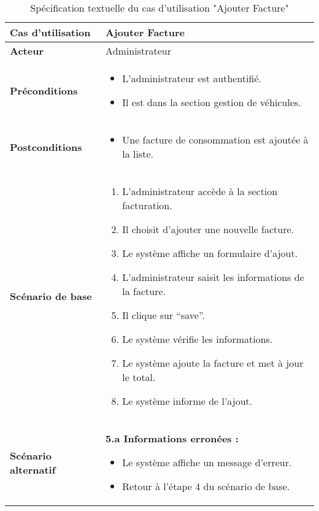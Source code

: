 \documentclass[a4paper,11pt]{report}
\begin{document}
\begin{table}[H]
  \centering
  \renewcommand{\arraystretch}{1.5}
  \caption{Spécification textuelle du cas d'utilisation "Ajouter Facture"}
  \begin{tabularx}{\textwidth}{|l|X|}
    \hline
    \textbf{Cas d'utilisation} & Ajouter Facture \\ \hline
    \textbf{Acteur}            & Administrateur \\ \hline
    \textbf{Préconditions}     & 
      \begin{itemize}
        \item L’administrateur est authentifié.
        \item Il est dans la section gestion de véhicules.
      \end{itemize} \\ \hline
    \textbf{Postconditions}    & 
      \begin{itemize}
        \item Une facture de consommation est ajoutée à la liste.
      \end{itemize} \\ \hline
    \textbf{Scénario de base}  & 
      \begin{enumerate}
        \item L’administrateur accède à la section facturation.
        \item Il choisit d’ajouter une nouvelle facture.
        \item Le système affiche un formulaire d’ajout.
        \item L’administrateur saisit les informations de la facture.
        \item Il clique sur “save”.
        \item Le système vérifie les informations.
        \item Le système ajoute la facture et met à jour le total.
        \item Le système informe de l’ajout.
      \end{enumerate} \\ \hline
    \textbf{Scénario alternatif} & 
      \textbf{5.a Informations erronées :}
      \begin{itemize}
        \item Le système affiche un message d’erreur.
        \item Retour à l’étape 4 du scénario de base.
      \end{itemize} \\ \hline
  \end{tabularx}
\end{table}
\end{document}
